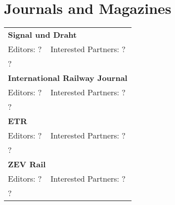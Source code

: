 ﻿\section{Journals and Magazines}

\renewcommand{\tableentry}[4]{\multicolumn{2}{|l|}{\textbf{#1}}\\Editors: #2&Interested Partners: #3\\\multicolumn{2}{|p{\textwidth}|}{#4}\\\hline}

\begin{longtable}{|ll|}
 \hline
 \tableentry{Signal und Draht}{?}{?}{
	?
 }
 \tableentry{International Railway Journal}{?}{?}{
	?
 }
 \tableentry{ETR}{?}{?}{
	?
 }
 \tableentry{ZEV Rail}{?}{?}{
	?
 }
\end{longtable}
